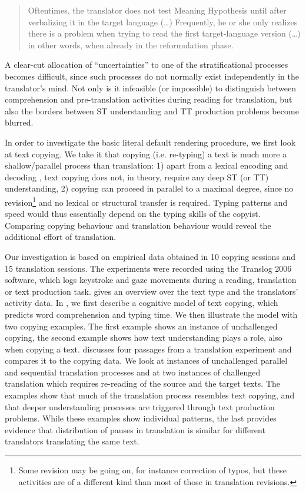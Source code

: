 \documentclass[output=paper]{LSP/langsci}
\begin{document}
\begin{quote}
Oftentimes, the translator does not test Meaning Hypothesis until after verbalizing it in the target language (\ldots) Frequently, he or she only realizes there is a problem when trying to read the first target-language version (\ldots) in other words, when already in the reformulation phase. 
\end{quote}

A clear-cut allocation of ``uncertainties'' to one of the stratificational processes becomes difficult, since such processes do not normally exist independently in the translator's mind. Not only is it infeasible (or impossible) to distinguish between comprehension and pre-translation activities during reading for translation, but also the borders between ST understanding and TT production problems become blurred. 

In order to investigate the basic literal default rendering procedure, we first look at text copying. We take it that copying (i.e. re-typing) a text is much more a shallow/parallel process than translation: 1) apart from a lexical encoding and decoding \citep{John1996}, text copying does not, in theory, require any deep ST (or TT) understanding, 2) copying can proceed in parallel to a maximal degree, since no revision\footnote{Some revision may be going on, for instance correction of typos, but these activities are of a different kind than most of those in translation revisions.} and no lexical or structural transfer is required. Typing patterns and speed would thus essentially depend on the typing skills of the copyist. Comparing copying behaviour and translation behaviour would reveal the additional effort of translation. 

Our investigation is based on empirical data obtained in 10 copying sessions and 15 translation sessions. The experiments were recorded using the Translog 2006 software, which logs keystroke and gaze movements during a reading, translation or text production task.  gives an overview over the text type and the translators' activity data. In , we first describe a cognitive model of text copying, which predicts word comprehension and typing time. We then illustrate the model with two copying examples. The first example shows an instance of  unchallenged copying, the second example shows how text understanding plays a role, also when copying a text.  discusses four passages from a translation experiment and compares it to the copying data. We look at instances of unchallenged parallel and sequential translation processes and at two instances of challenged translation which requires re-reading of the source and the target texts. The examples show that much of the translation process resembles text copying, and that deeper understanding processes are triggered through text production problems. While these examples show individual patterns, the last  provides evidence that distribution of pauses in translation is similar for different translators translating the same text. 
\end{document}
